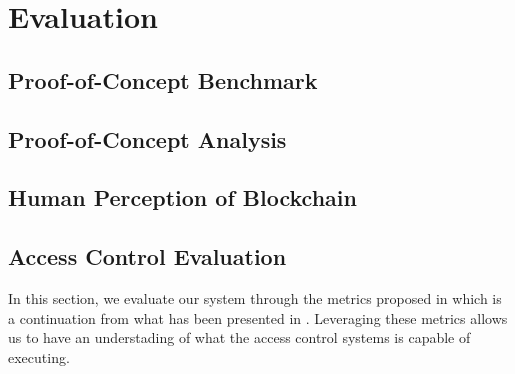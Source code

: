 \chapter{Evaluation}
\label{chap:evaluation}

\section{Proof-of-Concept Benchmark}
\label{sec:eval-benchmark}

\section{Proof-of-Concept Analysis}

\section{Human Perception of Blockchain}

\section{Access Control Evaluation}

In this section, we evaluate our system through the metrics proposed in \cite{hu_guidelines_2012} which is a continuation from what has been presented in \cite{hu_assessment_2006}. Leveraging these metrics allows us to have an understading of what the access control systems is capable of executing.

